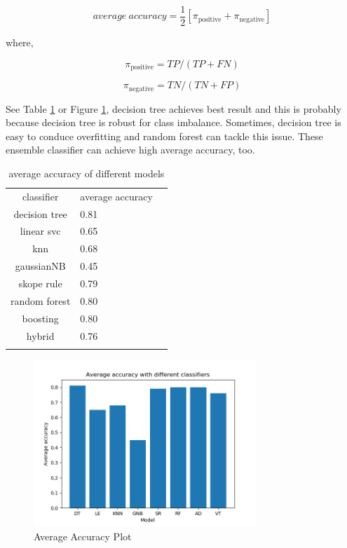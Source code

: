 \begin{equation}
average \ accuracy=\frac{1}{2}[\pi_{\textrm{positive}}+\pi_{\textrm{negative}}]
\end{equation}

where,

\begin{equation}
\pi_{\textrm{positive}}=TP/(TP+FN)
\end{equation}

\begin{equation}
\pi_{\textrm{negative}}=TN/(TN+FP)
\end{equation}

See Table \ref{tab:average_accuracy} or Figure \ref{fig: average_accuracy_png}, decision tree achieves best result and this is probably because decision tree is robust for class imbalance. Sometimes, decision tree is easy to conduce overfitting and random forest can tackle this issue. These ensemble classifier can achieve high average accuracy, too.

\begin{table}[h]
\caption{average accuracy of different models}
\label{tab:average_accuracy}       %
\begin{tabular}{clc}
\hline\noalign{\smallskip}
classifier & average accuracy  \\
decision tree & 0.81 \\
linear svc & 0.65 \\
knn & 0.68 \\
gaussianNB & 0.45 \\
skope rule & 0.79 \\
random forest & 0.80 \\
boosting & 0.80 \\
hybrid & 0.76 \\
\noalign{\smallskip}\hline
\end{tabular}
\end{table}

\begin{figure}
  \includegraphics[width=0.75\textwidth]
  {average_accuracy.png}
\caption{Average Accuracy Plot}
\label{fig: average_accuracy_png}       %
\end{figure}

